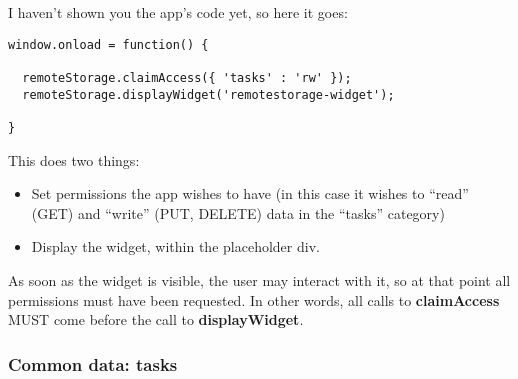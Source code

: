 \documentclass[11pt]{article}
\begin{document}
    I haven't shown you the app's code yet, so here it goes:


\begin{verbatim}
window.onload = function() {

  remoteStorage.claimAccess({ 'tasks' : 'rw' });
  remoteStorage.displayWidget('remotestorage-widget');

}
\end{verbatim}

    This does two things:
\begin{itemize}
\item Set permissions the app wishes to have (in this case it wishes to ``read'' (GET) and ``write'' (PUT, DELETE) data in the ``tasks'' category)
\item Display the widget, within the placeholder div.
\end{itemize}
  
    As soon as the widget is visible, the user may interact with it, so at that point all permissions must have been requested. In other words, all calls to \textbf{claimAccess} MUST come before the call to \textbf{displayWidget}.
\subsubsection{Common data: tasks}
\label{sec-1-7-2}


    
\end{document}
